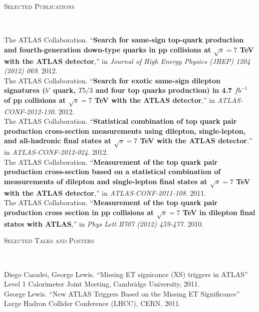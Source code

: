 \documentclass[9pt]{article}
\newenvironment{changemargin}[2]{%
  \begin{list}{}{%
    \setlength{\topsep}{0pt}%
    \setlength{\leftmargin}{#1}%
    \setlength{\rightmargin}{#2}%
    \setlength{\listparindent}{\parindent}%
    \setlength{\itemindent}{\parindent}%
    \setlength{\parsep}{\parskip}%
  }%
  \item[]}{\end{list}
}
\newcommand{\lineover}{
	\begin{changemargin}{-0.05in}{-0.05in}
		\vspace*{-8pt}
		\hrulefill \\
		\vspace*{-2pt}
	\end{changemargin}
}
\newcommand{\header}[1]{
	\begin{changemargin}{-0.5in}{-0.5in}
		\scshape{#1}\\
  	\lineover
	\end{changemargin}
}
\newenvironment{body} {
	\vspace*{-16pt}
	\begin{changemargin}{-0.25in}{-0.5in}
  }	
	{\end{changemargin}
}
\begin{document}
\smallskip



\header{Selected Publications}

\begin{body}
  \vspace{14pt}
  The ATLAS Collaboration. ``\textbf{Search for same-sign top-quark production and fourth-generation down-type quarks in pp collisions at $\sqrt{s}=7$ TeV with the ATLAS detector},'' in \emph{Journal of High Energy Physics (JHEP) 1204 (2012) 069}. 2012.\\
  \smallskip
  The ATLAS Collaboration. ``\textbf{Search for exotic same-sign dilepton signatures ($b'$ quark, $T5/3$ and four top quarks production) in 4.7 $fb^{-1}$ of pp collisions at $\sqrt{s}=7$ TeV with the ATLAS detector},'' in \emph{ATLAS-CONF-2012-130}. 2012.\\
  \smallskip
  The ATLAS Collaboration.  ``\textbf{Statistical combination of top quark pair production cross-section measurements using dilepton, single-lepton, and all-hadronic final states at $\sqrt{s}=7$ TeV with the ATLAS detector},'' in \emph{ATLAS-CONF-2012-024}. 2012. \\
  \smallskip
  The ATLAS Collaboration.  ``\textbf{Measurement of the top quark pair production cross-section based on a statistical combination of measurements of dilepton and single-lepton final states at $\sqrt{s}=7$ TeV with the ATLAS detector},'' in \emph{ATLAS-CONF-2011-108}. 2011. \\
  \smallskip
  The ATLAS Collaboration. ``\textbf{Measurement of the top quark pair production cross section in pp collisions at $\sqrt{s}=7$ TeV in dilepton final states with ATLAS},'' in \emph{Phys Lett B707 (2012) 459-477}. 2010.\\
\end{body}



\header{Selected Talks and Posters}
\begin{body}
	\vspace{14pt}
        Diego Casadei, George Lewis. ``Missing ET signicance (XS) triggers in ATLAS'' Level 1 Calorimeter Joint Meeting, Cambridge University, 2011. \\
        \smallskip
        George Lewis.  ``New ATLAS Triggers Based on the Missing ET Significance'' Large Hadron Collider Conference (LHCC), CERN, 2011. \\
\end{body}
\end{document}

